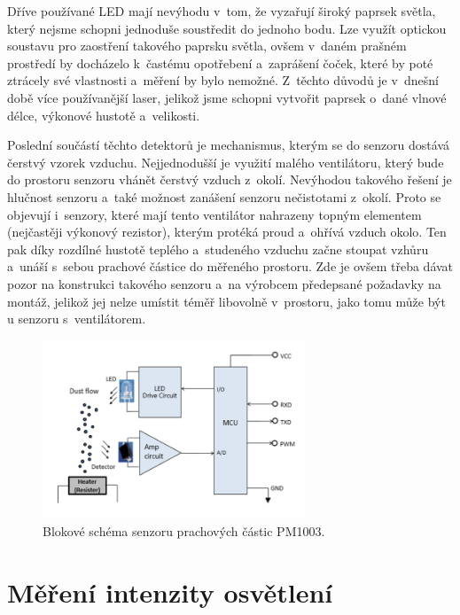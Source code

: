Dříve používané LED mají nevýhodu v~tom, že vyzařují široký paprsek světla, který nejsme schopni jednoduše soustředit do jednoho bodu. Lze využít optickou soustavu pro zaostření takového paprsku světla, ovšem v~daném prašném prostředí by docházelo k~častému opotřebení a~zaprášení čoček, které by poté ztrácely své vlastnosti a~měření by bylo nemožné. Z~těchto důvodů je v~dnešní době více používanější laser, jelikož jsme schopni vytvořit paprsek o~dané vlnové délce, výkonové hustotě a~velikosti. 

Poslední součástí těchto detektorů je mechanismus, kterým se do senzoru dostává čerstvý vzorek vzduchu. Nejjednodušší je využití malého ventilátoru, který bude do prostoru senzoru vhánět čerstvý vzduch z~okolí. Nevýhodou takového řešení je hlučnost senzoru a~také možnost zanášení senzoru nečistotami z~okolí. Proto se objevují i~senzory, které mají tento ventilátor nahrazeny topným elementem (nejčastěji výkonový rezistor), kterým protéká proud a~ohřívá vzduch okolo. Ten pak díky rozdílné hustotě teplého a~studeného vzduchu začne stoupat vzhůru a~unáší s~sebou prachové částice do měřeného prostoru. Zde je ovšem třeba dávat pozor na konstrukci takového senzoru a~na výrobcem předepsané požadavky na montáž, jelikož jej nelze umístit téměř libovolně v~prostoru, jako tomu může být u senzoru s~ventilátorem.

\begin{figure}
    \centering
    \includegraphics[width=0.70\textwidth]{obrazky/dustSensorPrinciple.png}
    \caption{Blokové schéma senzoru prachových částic PM1003. \cite{PM1003Datasheet}}
    \label{fig_dustSensorPrinciple}
\end{figure}

\section{Měření intenzity osvětlení}

